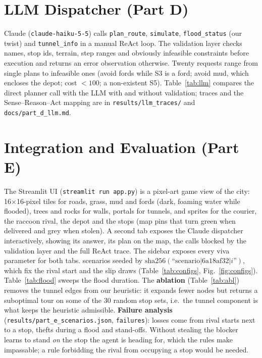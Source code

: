 \documentclass[conference]{IEEEtran}
\begin{document}
\section{LLM Dispatcher (Part D)}
Claude (\texttt{claude-haiku-5-5}) calls \texttt{plan\_route}, \texttt{simulate},
\texttt{flood\_status} (our twist) and \texttt{tunnel\_info} in a manual ReAct loop. The
validation layer checks names, stop ids, terrain, step ranges and obviously infeasible
constraints before execution and returns an error observation otherwise. Twenty requests
range from single plans to infeasible ones (avoid fords while S3 is a ford; avoid mud, which
encloses the depot; cost $<100$; a non-existent S5). Table~\ref{tab:llm} compares the direct
planner call with the LLM with and without validation; traces and the Sense--Reason--Act
mapping are in \texttt{results/llm\_traces/} and \texttt{docs/part\_d\_llm.md}.

\section{Integration and Evaluation (Part E)}
The Streamlit UI (\texttt{streamlit run app.py}) is a pixel-art game view of the city:
16$\times$16-pixel tiles for roads, grass, mud and fords (dark, foaming water while flooded),
trees and rocks for walls, portals for tunnels, and sprites for the courier, the raccoon rival,
the depot and the stops (map pins that turn green when delivered and grey when stolen). A second
tab exposes the Claude dispatcher interactively, showing its answer, its plan on the map, the
calls blocked by the validation layer and the full ReAct trace. The sidebar exposes every viva
parameter for both tabs.
scenarios seeded by $\mathrm{sha256}(\text{``scenario}|\text{6a18af32}|i\text{''})$, which fix
the rival start and the slip draws (Table~\ref{tab:configs}, Fig.~\ref{fig:configs}).
Table~\ref{tab:flood} sweeps the flood duration. The \textbf{ablation} (Table~\ref{tab:abl})
removes the tunnel edges from our heuristic: it expands fewer nodes but returns a suboptimal
tour on some of the 30 random stop sets, i.e.\ the tunnel component is what keeps the
heuristic admissible. \textbf{Failure analysis} (\texttt{results/part\_e\_scenarios.json},
\texttt{failures}): losses come from rival starts next to a stop, thefts during a flood and
stand-offs. Without stealing the blocker learns to stand \emph{on} the stop the agent is
heading for, which the rules make impassable; a rule forbidding the rival from occupying a
stop would be needed.
\end{document}
